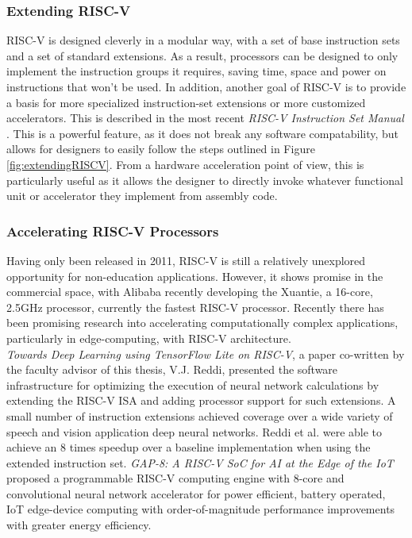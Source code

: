     \subsubsection*{Extending RISC-V}
    RISC-V is designed cleverly in a modular way, with a set of base instruction sets and a set of standard extensions. As a result, processors can be designed to only implement the instruction groups it requires, saving time, space and power on instructions that won't be used. In addition, another goal of RISC-V is to provide a basis for more specialized instruction-set extensions or more customized accelerators. This is described in the most recent \textit{RISC-V Instruction Set Manual} \cite{Waterman2019}. This is a powerful feature, as it does not break any software compatability, but allows for designers to easily follow the steps outlined in Figure \ref{fig:extendingRISCV}. From a hardware acceleration point of view, this is particularly useful as it allows the designer to directly invoke whatever functional unit or accelerator they implement from assembly code.
    

    \subsubsection*{Accelerating RISC-V Processors}
    Having only been released in 2011, RISC-V is still a relatively unexplored opportunity for non-education applications. However, it shows promise in the commercial space, with Alibaba recently developing the Xuantie, a 16-core, 2.5GHz processor, currently the fastest RISC-V processor. Recently there has been promising research into accelerating computationally complex applications, particularly in edge-computing, with RISC-V architecture. \\
    \textit{Towards Deep Learning using TensorFlow Lite on RISC-V}, a paper co-written by the faculty advisor of this thesis, V.J. Reddi, presented the software infrastructure for optimizing the execution of neural network calculations by extending the RISC-V ISA and adding processor support for such extensions. A small number of instruction extensions achieved coverage over a wide variety of speech and vision application deep neural networks. Reddi et al. were able to achieve an 8 times speedup over a baseline implementation when using the extended instruction set.
    \textit{GAP-8: A RISC-V SoC for AI at the Edge of the IoT} proposed a programmable RISC-V computing engine with 8-core and convolutional neural network accelerator for power efficient, battery operated, IoT edge-device computing with order-of-magnitude performance improvements with greater energy efficiency. \\

